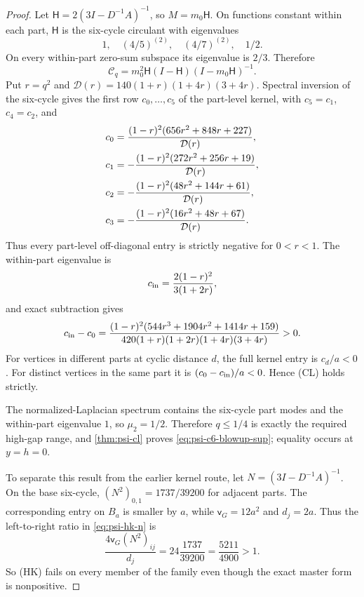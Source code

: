 \documentclass[11pt]{article}
\begin{document}
\begin{proof}
Let $\mathsf H=2(3I-D^{-1}A)^{-1}$, so $M=m_0\mathsf H$.  On functions
constant within each part, $\mathsf H$ is the six-cycle circulant with
eigenvalues
\begin{equation*}
 1,\quad (4/5)^{(2)},\quad(4/7)^{(2)},\quad1/2.
\end{equation*}
On every within-part zero-sum subspace its eigenvalue is $2/3$.  Therefore
\begin{equation}
 \mathcal C_q
 =m_0^2\mathsf H(I-\mathsf H)(I-m_0\mathsf H)^{-1}.
 \label{eq:psi-c6-blowup-c}
\end{equation}
Put $r=q^2$ and
$\mathcal D(r)=140(1+r)(1+4r)(3+4r)$.  Spectral inversion of the six-cycle
gives the first row $c_0,\ldots,c_5$ of the part-level kernel, with
$c_5=c_1$, $c_4=c_2$, and
\begin{align}
 c_0&=\frac{(1-r)^2(656r^2+848r+227)}{\mathcal D(r)},\notag\\
 c_1&=-\frac{(1-r)^2(272r^2+256r+19)}{\mathcal D(r)},\notag\\
 c_2&=-\frac{(1-r)^2(48r^2+144r+61)}{\mathcal D(r)},\notag\\
 c_3&=-\frac{(1-r)^2(16r^2+48r+67)}{\mathcal D(r)}.
 \label{eq:psi-c6-circulant-entries}
\end{align}
Thus every part-level off-diagonal entry is strictly negative for
$0<r<1$.  The within-part eigenvalue is
\begin{equation*}
 c_{\rm in}=\frac{2(1-r)^2}{3(1+2r)},
\end{equation*}
and exact subtraction gives
\begin{equation}
 c_{\rm in}-c_0
 =\frac{(1-r)^2(544r^3+1904r^2+1414r+159)}
 {420(1+r)(1+2r)(1+4r)(3+4r)}>0.
 \label{eq:psi-c6-within-margin}
\end{equation}
For vertices in different parts at cyclic distance $d$, the full kernel
entry is $c_d/a<0$.  For distinct vertices in the same part it is
$(c_0-c_{\rm in})/a<0$.  Hence \textup{(CL)} holds strictly.

The normalized-Laplacian spectrum contains the six-cycle part modes and
the within-part eigenvalue $1$, so $\mu_2=1/2$.  Therefore
$q\leq1/4$ is exactly the required high-gap range, and
\cref{thm:psi-cl} proves \cref{eq:psi-c6-blowup-sup}; equality occurs at
$y=h=0$.

To separate this result from the earlier kernel route, let
$N=(3I-D^{-1}A)^{-1}$.  On the base six-cycle,
$(N^2)_{0,1}=1737/39200$ for adjacent parts.  The corresponding entry on
$B_a$ is smaller by $a$, while $\mathsf v_G=12a^2$ and $d_j=2a$.
Thus the left-to-right ratio in \cref{eq:psi-hk-n} is
\begin{equation}
 \frac{4\mathsf v_G(N^2)_{ij}}{d_j}
 =24\frac{1737}{39200}
 =\frac{5211}{4900}>1.
 \label{eq:psi-c6-hk-failure}
\end{equation}
So \textup{(HK)} fails on every member of the family even though the exact
master form is nonpositive.
\end{proof}
\end{document}
